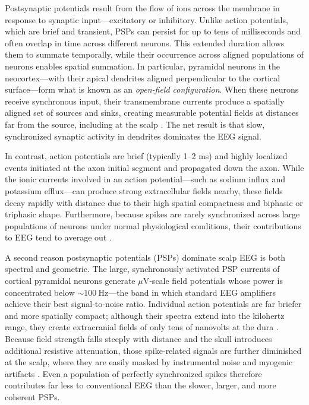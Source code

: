 \documentclass[final, a4paper,masters,en,listoffigures,listoftables,norwegiandates]{NMBU}
\begin{document}
Postsynaptic potentials result from the flow of ions across the membrane in response to synaptic input—excitatory or inhibitory. Unlike action potentials, which are brief and transient, PSPs can persist for up to tens of milliseconds and often overlap in time across different neurons. This extended duration allows them to summate temporally, while their occurrence across aligned populations of neurons enables spatial summation. In particular, pyramidal neurons in the neocortex—with their apical dendrites aligned perpendicular to the cortical surface—form what is known as an \textit{open-field configuration}. When these neurons receive synchronous input, their transmembrane currents produce a spatially aligned set of sources and sinks, creating measurable potential fields at distances far from the source, including at the scalp \cite{Halnes2024ElectricBrainSignals, Bear2015, BIASIUCCI2019R80}. The net result is that slow, synchronized synaptic activity in dendrites dominates the EEG signal.

In contrast, action potentials are brief (typically 1–2 ms) and highly localized events initiated at the axon initial segment and propagated down the axon. While the ionic currents involved in an action potential—such as sodium influx and potassium efflux—can produce strong extracellular fields nearby, these fields decay rapidly with distance due to their high spatial compactness and biphasic or triphasic shape. Furthermore, because spikes are rarely synchronized across large populations of neurons under normal physiological conditions, their contributions to EEG tend to average out \cite{Telenczuk2015, BIASIUCCI2019R80}.

A second reason postsynaptic potentials (PSPs) dominate scalp EEG is both spectral and geometric. The large, synchronously activated PSP currents of cortical pyramidal neurons generate $\mu$V‑scale field potentials whose power is concentrated below $\sim100~\mathrm{Hz}$—the band in which standard EEG amplifiers achieve their best signal‑to‑noise ratio. Individual action potentials are far briefer and more spatially compact; although their spectra extend into the kilohertz range, they create extracranial fields of only tens of nanovolts at the dura \cite{Telenczuk2015}. Because field strength falls steeply with distance and the skull introduces additional resistive attenuation, those spike-related signals are further diminished at the scalp, where they are easily masked by instrumental noise and myogenic artifacts \cite{kandel2021principles, Telenczuk2015}. Even a population of perfectly synchronized spikes therefore contributes far less to conventional EEG than the slower, larger, and more coherent PSPs.
\end{document}
